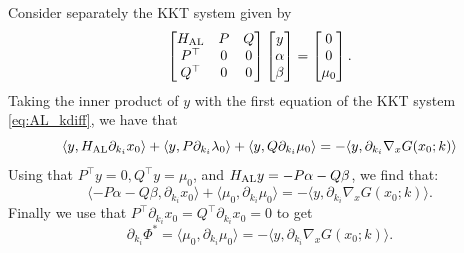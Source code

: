 \documentclass{siamart}
\begin{document}
Consider separately the KKT system given by 
\begin{equation}
\label{eq:AL_eta}
\begin{bmatrix}
H_{\rm AL} & P & Q\\
P^\top & 0 & 0\\
Q^\top & 0 & 0
\end{bmatrix}
\begin{bmatrix}
 y\\
\alpha \\
\beta
\end{bmatrix}
=
\begin{bmatrix}
 0\\
0\\
\mu_0
\end{bmatrix}.
\end{equation}
Taking the inner product of $y$ with the first equation of the KKT system \eqref{eq:AL_kdiff}, we have that 
\begin{equation*}
    \langle y,H_{\rm AL}\partial_{k_i} x_0 \rangle+ \langle y,P\partial_{k_i} \lambda_0 \rangle+ \langle y,Q\partial_{k_i} \mu_0 \rangle  = -\langle y,\partial_{k_i} \nabla_xG(x_0;k)\rangle
  \end{equation*}
Using that $P^\top y=0, Q^\top y = \mu_0$, and $H_{\rm AL}y = -P\alpha-Q\beta$, we find that:
  \begin{equation*}
       \langle -P\alpha -Q\beta,  \partial_{k_i} x_0 \rangle+ \langle \mu_0,\partial_{k_i} \mu_0 \rangle  = -\langle y,\partial_{k_i} \nabla_xG(x_0;k)\rangle.
\end{equation*}
Finally we use that $P^\top \partial_{k_i}x_0 = Q^\top \partial_{k_i}x_0 =0$ to get
\begin{equation}
      \partial_{k_i}\Phi^*=   \langle \mu_0,\partial_{k_i} \mu_0 \rangle  = -\langle y,\partial_{k_i} \nabla_xG(x_0;k)\rangle.
      \label{eq:grad_adjoint_loss}
\end{equation}
\end{document}
